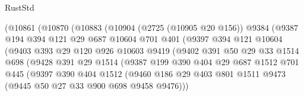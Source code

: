\begin{lexlean}{RustStd}
\begin{coremodule}
                        (@10861
                          (@10870
                            (@10883
                              (@10904
                                (@2725 (@10905 @20 @156))
                                @9384
                                (@9387
                                  @194
                                  @394
                                  @121
                                  @29
                                  @687
                                  @10604
                                  @701
                                  @401
                                  (@9397
                                    @394
                                    @121
                                    @10604
                                    (@9403
                                      @393
                                      @29
                                      @120
                                      @926
                                      @10603
                                      @9419
                                      (@9402
                                        @391
                                        @50
                                        @29
                                        @33
                                        @1514
                                        @698
                                        (@9428
                                          @391
                                          @29
                                          @1514
                                          (@9387
                                            @199
                                            @390
                                            @404
                                            @29
                                            @687
                                            @1512
                                            @701
                                            @445
                                            (@9397
                                              @390
                                              @404
                                              @1512
                                              (@9460
                                                @186
                                                @29
                                                @403
                                                @801
                                                @1511
                                                @9473
                                                (@9445 @50 @27 @33 @900 @698 @9458 @9476)))

\end{coremodule}
\end{lexlean}
